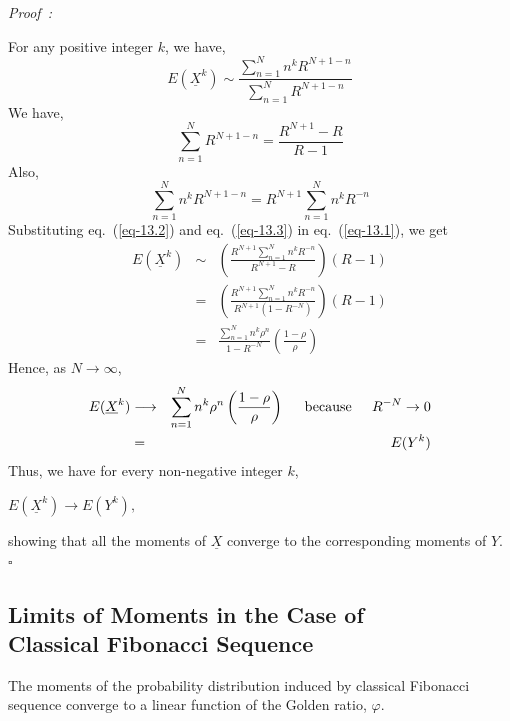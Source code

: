 \begin{multicols}{2}
{\it Proof~:}

For any positive integer $k$, we have,
\begin{equation}
E(\underline{X}^k)  \sim  \displaystyle{\frac{\displaystyle{\sum_{n=1}^{N}}n^k R^{N+1-n}}{\displaystyle{\sum_{n=1}^{N}}R^{N+1-n}}}\label{eq-13.1}
\end{equation}
We have,
\begin{equation}
\displaystyle{\sum_{n=1}^{N}}R^{N+1-n} = \displaystyle{\frac{R^{N+1}-R}{R-1}}\label{eq-13.2}
\end{equation}
Also,
\begin{equation}
\displaystyle{\sum_{n=1}^{N}}n^kR^{N+1-n} = R^{N+1}\displaystyle{\sum_{n=1}^{N}n^kR^{-n}}\label{eq-13.3}
\end{equation}
Substituting eq.~(\ref{eq-13.2}) and eq.~(\ref{eq-13.3}) in eq.~(\ref{eq-13.1}), we get
\begin{eqnarray}
E(\underline{X}^k) &\sim& \left(\displaystyle{\frac{R^{N+1}\displaystyle{\sum_{n=1}^{N}n^kR^{-n}}}{R^{N+1}-R}}\right)(R-1)\nonumber\\
&=& \left(\displaystyle{\frac{R^{N+1}\displaystyle{\sum_{n=1}^{N}n^kR^{-n}}}{R^{N+1}(1-R^{-N})}}\right)(R-1)\nonumber\\
&=& \displaystyle{\frac{\displaystyle{\sum_{n=1}^{N}}n^k\rho^{n}}{1-R^{-N}}}\left(\frac{1-\rho}{\rho}\right)\nonumber
\end{eqnarray}
Hence, as $N \rightarrow \infty$,
\begin{eqnarray}
E(\underline{X}^k) &\longrightarrow& \displaystyle{\sum_{n=1}^{N}n^k\rho^{n}}\left(\frac{1-\rho}{\rho}\right) \hspace{0.2in} \textup{because}\hspace{0.2in} R^{-N}\rightarrow 0\nonumber\\
&=& E(Y^k)\nonumber
\end{eqnarray}
Thus, we have for every non-negative integer $k$,
\begin{center}
 $E(\underline{X}^k) \longrightarrow E(Y^k),$ 
\end{center}
showing that all the moments of $\underline{X}$ converge to the corresponding moments of $Y$. 
\hfill{$\square$}

\subsection{Limits of Moments in the Case of\\ Classical Fibonacci Sequence}\label{subsection-13.1}
The moments of the probability distribution induced by classical Fibonacci sequence converge to a linear function of the Golden ratio, $\varphi$.


\end{multicols}
